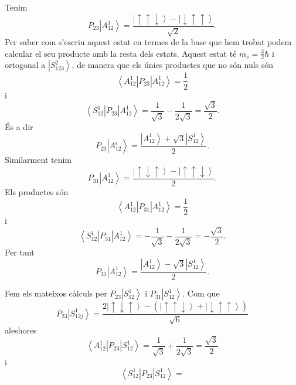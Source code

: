 \documentclass[12pt]{article}
\numberwithin{table}{section}
\numberwithin{figure}{section}
\numberwithin{equation}{section}
\renewcommand{\up}{\uparrow}
\newcommand{\down}{\downarrow}
\newcommand{\ket}[1]{\left\vert {#1} \right\rangle}
\newcommand{\bra}[1]{\left\langle #1 \right\vert}
\begin{document}
Tenim
\begin{equation*}
	P_{23}\ket{A_{12}^1} = \frac{\ket{\up\up\down} - \ket{\down\up\up}}{\sqrt{2}}.
\end{equation*}
Per saber com s'escriu aquest estat en termes de la base que hem trobat podem calcular el seu producte amb la resta dels estats. Aquest estat té \( m_s = \frac{3}{2}\hbar \) i ortogonal a \( \ket{S_{123}^2} \), de manera que els únics productes que no són nuls són
\begin{equation*}
	\bra{A_{12}^1}P_{23}\ket{A_{12}^1} = \frac{1}{2} 
\end{equation*}
i
\begin{equation*}
	\bra{S_{12}^1}P_{23}\ket{A_{12}^1} = \frac{1}{\sqrt{3}} - \frac{1}{2\sqrt{3}} = \frac{\sqrt{3}}{2}.
\end{equation*}
És a dir
\begin{equation}\label{eq:estat P23A12}
	P_{23}\ket{A_{12}^i} = \frac{\ket{A_{12}^1} + \sqrt{3}\ket{S_{12}^1}}{2}.
\end{equation}
Similarment tenim
\begin{equation*}
	P_{31}\ket{A_{12}^1} = \frac{\ket{\up\down\up} - \ket{\up\up\down}}{2}.
\end{equation*}
Els productes són
\begin{equation*}
	\bra{A_{12}^1}P_{31}\ket{A_{12}^1} = \frac{1}{2}
\end{equation*}
i
\begin{equation*}
	\bra{S_{12}^1}P_{31}\ket{A_{12}^1} = -\frac{1}{\sqrt{3}} - \frac{1}{2\sqrt{3}} = -\frac{\sqrt{3}}{2}.
\end{equation*}
Per tant
\begin{equation} \label{eqn:estat P31A12}
	P_{31}\ket{A_{12}^1} = \frac{\ket{A_{12}^1} - \sqrt{3}\ket{S_{12}^1}}{2}.
\end{equation}

Fem els mateixos càlculs per \( P_{23}\ket{S_{12}^1} \) i \( P_{31}\ket{S_{12}^1} \). Com que
\begin{equation*}
	P_{23}\ket{S_{12j}^1} = \frac{2\ket{\up\down\up} - (\ket{\up\up\down} + \ket{\down\up\up})}{\sqrt{6}}
\end{equation*}
aleshores
\begin{equation*}
	\bra{A_{12}^1}P_{23}\ket{S_{12}^1} = \frac{1}{\sqrt{3}} + \frac{1}{2\sqrt{3}} = \frac{\sqrt{3}}{2}
\end{equation*}
i
\begin{equation*}
	\bra{S_{12}^1}P_{23}\ket{S_{12}^1} =  
\end{equation*}
\end{document}
